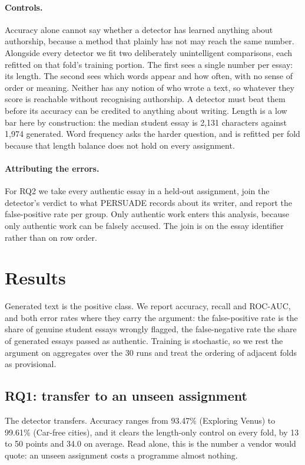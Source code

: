 \documentclass{article}
\begin{document}
\paragraph{Controls.}
Accuracy alone cannot say whether a detector has learned anything about
authorship, because a method that plainly has not may reach the same
number. Alongside every detector we fit two deliberately unintelligent
comparisons, each refitted on that fold's training portion. The first sees
a single number per essay: its length. The second sees which words appear
and how often, with no sense of order or meaning. Neither has any notion of
who wrote a text, so whatever they score is reachable without recognising
authorship. A detector must beat them before its accuracy can be credited
to anything about writing. Length is a low bar here by construction: the
median student essay is 2,131 characters against 1,974 generated. Word
frequency asks the harder question, and is refitted per fold because that
length balance does not hold on every assignment.

\paragraph{Attributing the errors.}
For RQ2 we take every authentic essay in a held-out assignment, join the
detector's verdict to what PERSUADE records about its writer, and report
the false-positive rate per group. Only authentic work enters this
analysis, because only authentic work can be falsely accused. The join is
on the essay identifier rather than on row order.

\section{Results}

Generated text is the positive class. We report accuracy, recall and
ROC-AUC, and both error rates where they carry the argument: the
false-positive rate is the share of genuine student essays wrongly flagged,
the false-negative rate the share of generated essays passed as authentic.
Training is stochastic, so we rest the argument on aggregates over the 30
runs and treat the ordering of adjacent folds as provisional.

\subsection{RQ1: transfer to an unseen assignment}

The detector transfers. Accuracy ranges from 93.47\% (Exploring Venus) to
99.61\% (Car-free cities), and it clears the length-only control on every
fold, by 13 to 50 points and 34.0 on average. Read alone, this is the
number a vendor would quote: an unseen assignment costs a programme almost
nothing.
\end{document}
